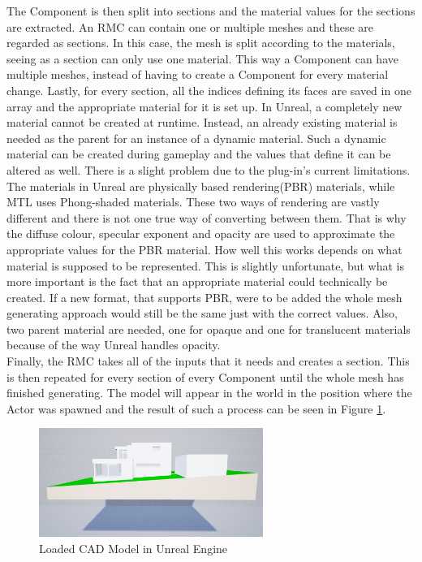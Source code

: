 The Component is then split into sections and the material values for the sections are extracted. An \acs{RMC} can contain one or multiple meshes and these are regarded as sections. In this case, the mesh is split according to the materials, seeing as a section can only use one material. This way a Component can have multiple meshes, instead of having to create a Component for every material change. Lastly, for every section, all the indices defining its faces are saved in one array and the appropriate material for it is set up. In Unreal, a completely new material cannot be created at runtime. Instead, an already existing material is needed as the parent for an instance of a dynamic material. Such a dynamic material can be created during gameplay and the values that define it can be altered as well. There is a slight problem due to the plug-in's current limitations. The materials in Unreal are physically based rendering(\acs{PBR}) materials\cite{bib:UEPBR}, while MTL uses Phong-shaded materials\cite{bib:MTL}. These two ways of rendering are vastly different and there is not one true way of converting between them. That is why the diffuse colour, specular exponent and opacity are used to approximate the appropriate values for the \acs{PBR} material. How well this works depends on what material is supposed to be represented. This is slightly unfortunate, but what is more important is the fact that an appropriate material could technically be created. If a new format, that supports \acs{PBR}, were to be added the whole mesh generating approach would still be the same just with the correct values. Also, two parent material are needed, one for opaque and one for translucent materials because of the way Unreal handles opacity.\\
Finally, the \acs{RMC} takes all of the inputs that it needs and creates a section. This is then repeated for every section of every Component until the whole mesh has finished generating. The model will appear in the world in the position where the Actor was spawned and the result of such a process can be seen in Figure \ref{fig:LoadedModel}.

\begin{figure}[htpb]
	\centering
	\includegraphics[width=0.65\textwidth]{fig/LoadedModel2.png}
	\caption[Loaded CAD Model in Unreal Engine]{Loaded CAD Model in Unreal Engine\protect\footnotemark}
	\label{fig:LoadedModel}
\end{figure}

